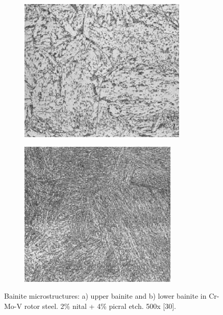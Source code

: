 \documentclass[12pt]{report}
\begin{document}
\begin{figure}[H]

\centering
\begin{subfigure}{.45\textwidth}
    \centering
    \includegraphics[height=.9\textwidth, width=\textwidth]{upper_bainite_microstruce.jpg}
    \caption{}
\end{subfigure}
\begin{subfigure}{.45\textwidth}
    \centering
    \includegraphics[height=.9\textwidth, width=\textwidth]{lower_bainite_microstructure.jpg}
    \caption{}
\end{subfigure}

\caption{Bainite microstructures: a) upper bainite and b) lower bainite in Cr-Mo-V rotor steel. 2\% nital + 4\% picral etch. 500x [30].}
\label{ch3:figure:bainite:microstructures}
\end{figure}
\end{document}
